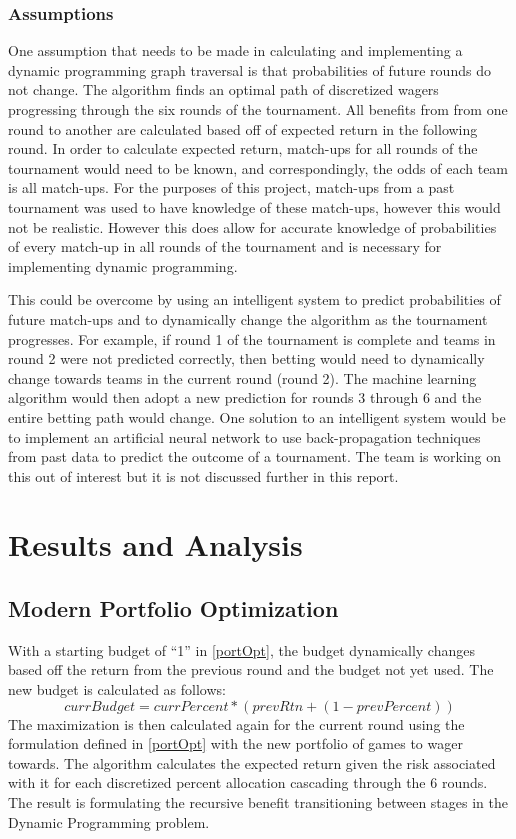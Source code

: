 \documentclass[12pt]{article}
\begin{document}
\subsubsection{Assumptions}
One assumption that needs to be made in calculating and implementing a dynamic programming graph traversal is that probabilities of future rounds do not change.
The algorithm finds an optimal path of discretized wagers progressing through the six rounds of the tournament. 
All benefits from from one round to another are calculated based off of expected return in the following round.
In order to calculate expected return, match-ups for all rounds of the tournament would need to be known, and correspondingly, the odds of each team is all match-ups. 
For the purposes of this project, match-ups from a past tournament was used to have knowledge of these match-ups, however this would not be realistic.
However this does allow for accurate knowledge of probabilities of every match-up in all rounds of the tournament and is necessary for implementing dynamic programming.

This could be overcome by using an intelligent system to predict probabilities of future match-ups and to dynamically change the algorithm as the tournament progresses. 
For example, if round 1 of the tournament is complete and teams in round 2 were not predicted correctly, then betting would need to dynamically change towards teams in the current round (round 2).
The machine learning algorithm would then adopt a new prediction for rounds 3 through 6 and the entire betting path would change.
One solution to an intelligent system would be to implement an artificial neural network to use back-propagation techniques from past data to predict the outcome of a tournament.
The team is working on this out of interest but it is not discussed further in this report.

\newpage
\section{Results and Analysis}
\subsection{Modern Portfolio Optimization}
With a starting budget of ``1'' in \eqref{portOpt}, the budget dynamically changes based off the return from the previous round and the budget not yet used.
The new budget is calculated as follows:
\begin{equation*}
currBudget = currPercent*(prevRtn + (1-prevPercent))
\end{equation*}
The maximization is then calculated again for the current round using the formulation defined in \eqref{portOpt} with the new portfolio of games to wager towards.
The algorithm calculates the expected return given the risk associated with it for each discretized percent allocation cascading through the 6 rounds.
The result is formulating the recursive benefit transitioning between stages in the Dynamic Programming problem.
\end{document}
